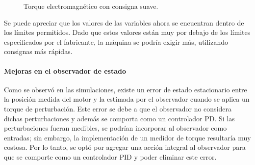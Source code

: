 \documentclass[a4paper, 10pt, onecolumn,journal]{ieeeconf}
\begin{document}
\begin{figure}[H]
	\centering
	\begin{adjustbox}{scale=0.5,max width=\columnwidth}
	\end{adjustbox}
	\caption{Torque electromagnético con consigna suave.}
	\label{Torque electromagnético con consigna suave}
\end{figure}
Se puede apreciar que los valores de las variables ahora se encuentran dentro de los límites permitidos. Dado que estos valores están muy por debajo de los límites especificados por el fabricante, la máquina se podría exigir más, utilizando consignas más rápidas.
\paragraph{\textbf{Mejoras en el observador de estado}} 
Como se observó en las simulaciones, existe un error de estado estacionario entre la posición medida del motor y la estimada por el observador cuando se aplica un torque de perturbación. Este error se debe a que el observador no considera dichas perturbaciones y además se comporta como un controlador PD. Si las perturbaciones fueran medibles, se podrían incorporar al observador como entradas; sin embargo, la implementación de un medidor de torque resultaría muy costosa. Por lo tanto, se optó por agregar una acción integral al observador para que se comporte como un controlador PID y poder eliminar este error.
\end{document}
